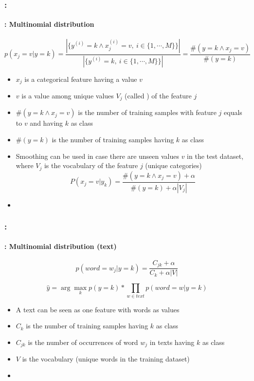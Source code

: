\documentclass[xcolor=table]{beamer}
\begin{document}
\begin{frame}
	\frametitle{\insertshortsubtitle: \insertsection}
	\framesubtitle{\insertsubsection: Multinomial distribution}
	
	\[p(x_j = v|y=k) = \frac{|\{y^{(i)} = k \wedge x^{(i)}_j = v,\ i \in \{1, \cdots, M\}\}|}{|\{y^{(i)} = k,\ i \in \{1, \cdots, M\}\}|} = \frac{\#(y = k \wedge x_j = v)}{\#(y = k)}\]
	
	\begin{itemize}
		\item $x_j$ is a categorical feature having a value $ v $
		\item $v$ is a value among unique values $ V_j $ (called ) of the feature $j$
		\item $\#(y = k \wedge x_j = v)$ is the number of training samples with feature $j$ equals to $v$ and having $k$ as class
		\item $\#(y = k)$ is the number of training samples having $k$ as class
		\item Smoothing can be used in case there are unseen values $v$ in the test dataset,
		where $V_j$ is the vocabulary of the feature $j$ (unique categories)
		\[P(x_j = v|y_k) = \frac{\#(y = k \wedge x_j = v) + \alpha}{\#(y = k) + \alpha |V_j|}\]
		\item {}
	\end{itemize}
	
\end{frame}

\begin{frame}
	\frametitle{\insertshortsubtitle: \insertsection}
	\framesubtitle{\insertsubsection: Multinomial distribution (text)}
	
	\[p(word = w_j|y=k) = \frac{C_{jk} + \alpha}{C_k + \alpha |V|}\]
	
	\vfill
	
	\[\hat{y} = \arg\max_{k} p(y=k) * \prod_{w \in text} p(word = w|y=k)\]
	
	\vfill
	
	\begin{itemize}
		\item A text can be seen as one feature with words as values
		\item $C_k$ is the number of training samples having $k$ as class
		\item $C_{jk}$ is the number of occurrences of word $w_j$ in texts having $k$ as class
		\item $V$ is the vocabulary (unique words in the training dataset)
		\item {}
	\end{itemize}
	
\end{frame}
\end{document}
